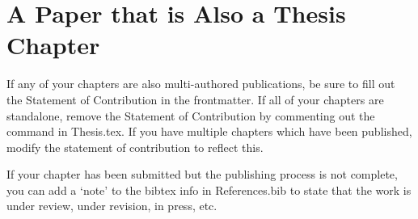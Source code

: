 \chapter{A Paper that is Also a Thesis Chapter}
\label{Chapter:Published}

If any of your chapters are also multi-authored publications, be sure to fill out the Statement of Contribution in the frontmatter. If all of your chapters are standalone, remove the Statement of Contribution by commenting out the \verb|| command in Thesis.tex. If you have multiple chapters which have been published, modify the statement of contribution to reflect this. 

If your chapter has been submitted but the publishing process is not complete, you can add a `note' to the bibtex info in References.bib to state that the work is under review, under revision, in press, etc.